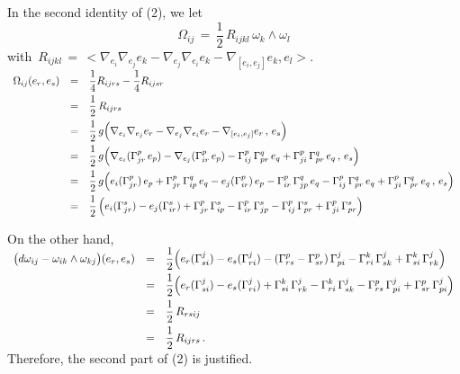 \documentclass{article}[12pt,a4paper]
\begin{document}
In the second identity of (2), we let
\begin{equation} 
\Omega_{ij} \,=\, \frac{1}{2}\,R_{ijkl}\,\omega_k\wedge\omega_l
\end{equation}
with \,$R_{ijkl}\,=\, 
<\nabla_{e_i}\nabla_{e_j}e_k -\nabla_{e_j}\nabla_{e_i}e_k - \nabla_{[e_i, e_j]}e_k, e_l>$. \\[0.1in]
$\begin{array}{rcl}
\Omega_{ij}(e_r, e_s) &=& \displaystyle \frac{1}{4} R_{ijrs} - \frac{1}{4} R_{ijsr} \\[0.1in]
&=& \displaystyle \frac{1}{2}\, R_{ijrs} \\[0.1in]
&=& \displaystyle \frac{1}{2}\, g\Big(\nabla_{e_i}\nabla_{e_j}e_r -\nabla_{e_j}\nabla_{e_i}e_r - \nabla_{[e_i, e_j]}e_r
	\,,\, e_s\Big) \\[0.1in]
&=& \displaystyle 
	\frac{1}{2}\, g\Big(\nabla_{e_i}(\Gamma_{jr}^p\,e_p) - \nabla_{e_j}(\Gamma_{ir}^p\,e_p) 
	- \Gamma_{ij}^p \, \Gamma_{pr}^q \, e_q + \Gamma_{ji}^p \, \Gamma_{pr}^q \, e_q 
	\,,\,e_s\Big) \\[0.1in]
&=& \displaystyle 
	\frac{1}{2}\, g\Big(e_i(\Gamma_{jr}^p)\,e_p + \Gamma_{jr}^p\, \Gamma_{ip}^q\, e_q 
	- e_j(\Gamma_{ir}^p)\,e_p - \Gamma_{ir}^p\, \Gamma_{jp}^q \, e_q 
	- \Gamma_{ij}^p \, \Gamma_{pr}^q \, e_q + \Gamma_{ji}^p \, \Gamma_{pr}^q \, e_q \,,\,e_s\Big) \\[0.1in]
&=& \displaystyle 
	\frac{1}{2}\, \Big(e_i(\Gamma_{jr}^s) - e_j(\Gamma_{ir}^s)
	+ \Gamma_{jr}^p\, \Gamma_{ip}^s - \Gamma_{ir}^p\, \Gamma_{jp}^s 
	- \Gamma_{ij}^p \, \Gamma_{pr}^s + \Gamma_{ji}^p \, \Gamma_{pr}^s \Big) 
\end{array}$ \\
\newpage

On the other hand,\\[0.1in]
$\begin{array}{rcl}
\big(d\omega_{ij} - \omega_{ik} \wedge \omega_{kj}\big)(e_r, e_s) &=& \displaystyle 
	\frac{1}{2} \Big( e_r(\Gamma_{si}^j) - e_s(\Gamma_{ri}^j) 
	- (\Gamma_{rs}^p - \Gamma_{sr}^p)\, \Gamma_{pi}^j 
	- \Gamma_{ri}^k\, \Gamma_{sk}^j + \Gamma_{si}^k\, \Gamma_{rk}^j\Big) \\[0.1in]
&=& \displaystyle 
	\frac{1}{2}\Big(e_r(\Gamma_{si}^j) -  e_s(\Gamma_{ri}^j) 
	+ \Gamma_{si}^k \, \Gamma_{rk}^j - \Gamma_{ri}^k \, \Gamma_{sk}^j
	- \Gamma_{rs}^p \, \Gamma_{pi}^j + \Gamma_{sr}^p\, \Gamma_{pi}^j \Big) \\[0.1in]
&=& \displaystyle 
	\frac{1}{2}\, R_{rsij} \\[0.1in]
&=& \displaystyle 
	\frac{1}{2}\, R_{ijrs} \,.
\end{array}$ \\[0.2in]
Therefore, the second part of (2) is justified. \\
\end{document}
